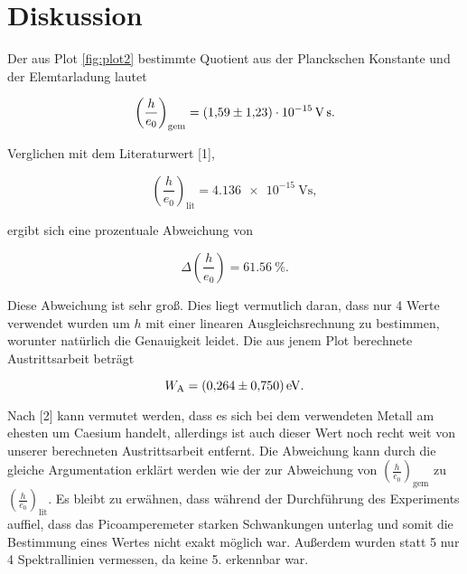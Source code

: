 \section{Diskussion}
\label{sec:Diskussion}

Der aus Plot \ref{fig:plot2} bestimmte Quotient aus der Planckschen Konstante und der Elemtarladung lautet 

\begin{equation*}
\left(\frac{h}{e_0}\right)_\text{gem} = \SI{1.59+-1.23e-15}{\volt\second}.
\end{equation*}

Verglichen mit dem Literaturwert [1],

\begin{equation*}
\left(\frac{h}{e_0}\right)_\text{lit} = \SI{4.136e-15}{\volt\second},
\end{equation*}

ergibt sich eine prozentuale Abweichung von

\begin{equation*}
\Delta\left(\frac{h}{e_0}\right) = \SI{61.56}{\percent}.
\end{equation*}

Diese Abweichung ist sehr groß. Dies liegt vermutlich daran, dass nur 4 Werte 
verwendet wurden um $h$ mit einer linearen Ausgleichsrechnung zu bestimmen, worunter
natürlich die Genauigkeit leidet. 
Die aus jenem Plot berechnete Austrittsarbeit beträgt 

\begin{equation*}
W_\text{A} = \SI{0.264+-0.750}{\eV}.
\end{equation*}

Nach [2] kann vermutet werden, dass es sich bei dem verwendeten Metall am ehesten um 
Caesium handelt, allerdings ist auch dieser Wert noch recht weit von unserer berechneten
Austrittsarbeit entfernt. Die Abweichung kann durch die gleiche Argumentation erklärt werden
wie der zur Abweichung von $\left(\frac{h}{e_0}\right)_\text{gem}$ zu $\left(\frac{h}{e_0}\right)_\text{lit}$.
Es bleibt zu erwähnen, dass während der Durchführung des Experiments auffiel, dass das Picoamperemeter
starken Schwankungen unterlag und somit die Bestimmung eines Wertes nicht exakt möglich war. 
Außerdem wurden statt 5 nur 4 Spektrallinien vermessen, da keine 5. erkennbar war. 
